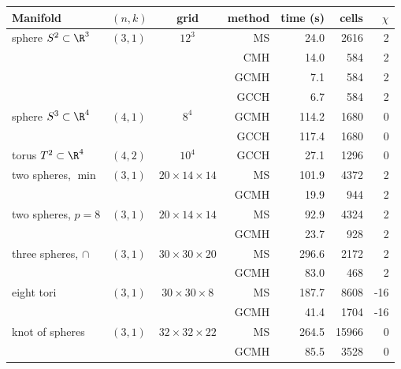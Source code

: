 \begin{tabular}{@{}llcrrrr@{}}
\toprule
Manifold & $(n,k)$ & grid & method & time (s) & cells & $\chi$\\
\midrule
sphere $S^2\subset\R^3$ & $(3,1)$ & $12^3$ & MS & 24.0 & 2616 & 2\\
 &  &  & CMH & 14.0 & 584 & 2\\
 &  &  & GCMH & 7.1 & 584 & 2\\
 &  &  & GCCH & 6.7 & 584 & 2\\
\addlinespace
sphere $S^3\subset\R^4$ & $(4,1)$ & $8^4$ & GCMH & 114.2 & 1680 & 0\\
 &  &  & GCCH & 117.4 & 1680 & 0\\
\addlinespace
torus $T^2\subset\R^4$ & $(4,2)$ & $10^4$ & GCCH & 27.1 & 1296 & 0\\
\addlinespace
two spheres, $\min$ & $(3,1)$ & $20\times14\times14$ & MS & 101.9 & 4372 & 2\\
 &  &  & GCMH & 19.9 & 944 & 2\\
\addlinespace
two spheres, $p=8$ & $(3,1)$ & $20\times14\times14$ & MS & 92.9 & 4324 & 2\\
 &  &  & GCMH & 23.7 & 928 & 2\\
\addlinespace
three spheres, $\cap$ & $(3,1)$ & $30\times30\times20$ & MS & 296.6 & 2172 & 2\\
 &  &  & GCMH & 83.0 & 468 & 2\\
\addlinespace
eight tori & $(3,1)$ & $30\times30\times8$ & MS & 187.7 & 8608 & -16\\
 &  &  & GCMH & 41.4 & 1704 & -16\\
\addlinespace
knot of spheres & $(3,1)$ & $32\times32\times22$ & MS & 264.5 & 15966 & 0\\
 &  &  & GCMH & 85.5 & 3528 & 0\\
\bottomrule
\end{tabular}
